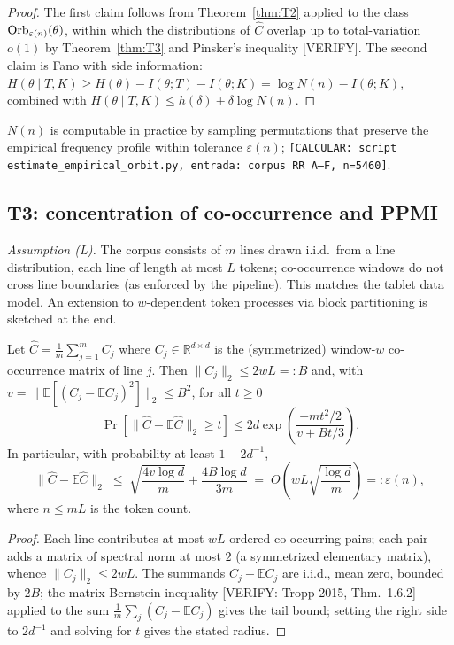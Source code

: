 \begin{proof}
The first claim follows from Theorem~\ref{thm:T2} applied to the class
$\mathrm{Orb}_{\varepsilon(n)}(\theta)$, within which the distributions of
$\hat C$ overlap up to total-variation $o(1)$ by
Theorem~\ref{thm:T3} and Pinsker's inequality [VERIFY]. The second
claim is Fano with side information:
$H(\theta\mid T,K)\ge H(\theta)-I(\theta;T)-I(\theta;K)
=\log N(n)-I(\theta;K)$, combined with
$H(\theta\mid T,K)\le h(\delta)+\delta\log N(n)$.
\end{proof}

\begin{remark}
$N(n)$ is computable in practice by sampling permutations that
preserve the empirical frequency profile within tolerance
$\varepsilon(n)$; \texttt{[CALCULAR: script
\texttt{estimate\_empirical\_orbit.py}, entrada: corpus RR A--F,
n=5460]}.
\end{remark}

\subsection{T3: concentration of co-occurrence and PPMI}

\emph{Assumption (L).} The corpus consists of $m$ lines drawn i.i.d.\
from a line distribution, each line of length at most $L$ tokens;
co-occurrence windows do not cross line boundaries (as enforced by the
pipeline). This matches the tablet data model. An extension to
$w$-dependent token processes via block partitioning is sketched at
the end.

\begin{theorem}
\label{thm:T3}
Let $\hat C=\frac1m\sum_{j=1}^{m}C_j$ where $C_j\in\mathbb{R}^{d\times d}$
is the (symmetrized) window-$w$ co-occurrence matrix of line $j$.
Then $\|C_j\|_2\le 2wL=:B$ and, with
$v=\|\mathbb{E}[(C_j-\mathbb{E}C_j)^2]\|_2\le B^2$, for all $t\ge0$
\[
\Pr\!\left[\|\hat C-\mathbb{E}\hat C\|_2\ge t\right]
\le 2d\exp\!\left(\frac{-mt^{2}/2}{v+Bt/3}\right).
\]
In particular, with probability at least $1-2d^{-1}$,
\[
\|\hat C-\mathbb{E}\hat C\|_2
\;\le\;
\sqrt{\frac{4v\log d}{m}}+\frac{4B\log d}{3m}
\;=\;O\!\left(wL\sqrt{\frac{\log d}{m}}\right)
=:\varepsilon(n),
\]
where $n\le mL$ is the token count.
\end{theorem}

\begin{proof}
Each line contributes at most $wL$ ordered co-occurring pairs; each
pair adds a matrix of spectral norm at most $2$ (a symmetrized
elementary matrix), whence $\|C_j\|_2\le 2wL$. The summands
$C_j-\mathbb{E}C_j$ are i.i.d., mean zero, bounded by $2B$; the matrix
Bernstein inequality [VERIFY: Tropp 2015, Thm.~1.6.2] applied to the
sum $\frac1m\sum_j (C_j-\mathbb{E}C_j)$ gives the tail bound; setting
the right side to $2d^{-1}$ and solving for $t$ gives the stated
radius.
\end{proof}


